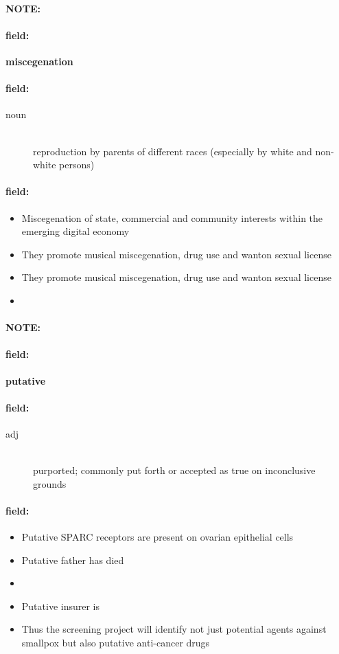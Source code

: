 \documentclass[12pt]{article}
\newenvironment{note}{\paragraph{NOTE:}}{}
\newenvironment{field}{\paragraph{field:}}{}
\begin{document}
\begin{note}
\begin{field}
\textbf{\large miscegenation}
\end{field}


\begin{field}
\begin{description}
\item[noun] \hfill \\ 
reproduction by parents of different races (especially by white and non-white persons)

\end{description}
\end{field}

\begin{field}
\begin{itemize}
\item Miscegenation of state, commercial and community interests within the emerging digital economy
\item They promote musical miscegenation, drug use and wanton sexual license
\item They promote musical miscegenation, drug use and wanton sexual license
\item 
\end{itemize}
\end{field}
\end{note}
\begin{note}
\begin{field}
\textbf{\large putative}
\end{field}


\begin{field}
\begin{description}
\item[adj] \hfill \\ 
purported; commonly put forth or accepted as true on inconclusive grounds

\end{description}
\end{field}

\begin{field}
\begin{itemize}
\item Putative SPARC receptors are present on ovarian epithelial cells
\item Putative father has died
\item 
\item Putative insurer is
\item Thus the screening project will identify not just potential agents against smallpox but also putative anti-cancer drugs
\end{itemize}
\end{field}
\end{note}
\end{document}
